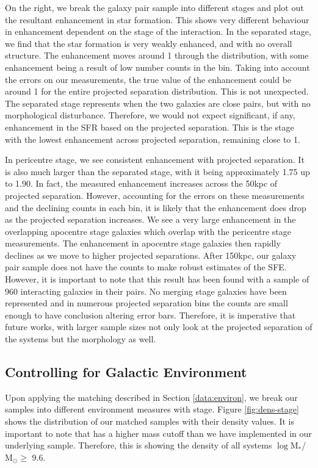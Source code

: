 On the right, we break the galaxy pair sample into different stages and plot out the resultant enhancement in star formation. This shows very different behaviour in enhancement dependent on the stage of the interaction. In the separated stage, we find that the star formation is very weakly enhanced, and with no overall structure. The enhancement moves around 1 through the distribution, with some enhancement being a result of low number counts in the bin. Taking into account the errors on our measurements, the true value of the enhancement could be around 1 for the entire projected separation distribution. This is not unexpected. The separated stage represents when the two galaxies are close pairs, but with no morphological disturbance. Therefore, we would not expect significant, if any, enhancement in the SFR based on the projected separation. This is the stage with the lowest enhancement across projected separation, remaining close to 1.

In pericentre stage, we see consistent enhancement with projected separation. It is also much larger than the separated stage, with it being approximately 1.75 up to 1.90. In fact, the measured enhancement increases across the 50kpc of projected separation. However, accounting for the errors on these measurements and the declining counts in each bin, it is likely that the enhancement does drop as the projected separation increases. We see a very large enhancement in the overlapping apocentre stage galaxies which overlap with the pericentre stage measurements. The enhancement in apocentre stage galaxies then rapidly declines as we move to higher projected separations. After 150kpc, our galaxy pair sample does not have the counts to make robust estimates of the SFE. However, it is important to note that this result has been found with a sample of 960 interacting galaxies in their pairs. No merging stage galaxies have been represented and in numerous projected separation bins the counts are small enough to have conclusion altering error bars. Therefore, it is imperative that future works, with larger sample sizes not only look at the projected separation of the systems but the morphology as well.

\subsection{Controlling for Galactic Environment} \label{sec:env-cont}
\noindent Upon applying the matching described in Section \ref{data:environ}, we break our samples into different environment measures with stage. Figure \ref{fig:dens-stage} shows the distribution of our matched samples with their density values. It is important to note that \citet{2017ApJ...837...16D} has a higher mass cutoff than we have implemented in our underlying sample. Therefore, this is showing the density of all systems $\log$M$_*$/ M$_\odot \geq$ 9.6. 

